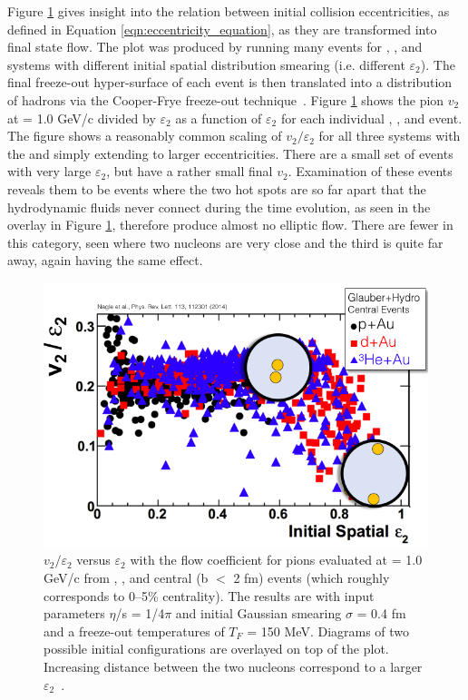 Figure \ref{fig:v2_epsi2_ampt} gives insight into the relation between initial collision eccentricities, as defined in Equation \ref{eqn:eccentricity_equation}, as they are transformed into final state flow. The plot was produced by running many events for \pau, \dau, and \hau systems with different initial spatial distribution smearing (i.e. different $\varepsilon_2$). The final freeze-out hyper-surface of each event is then translated into a distribution of hadrons via the Cooper-Frye freeze-out technique~\cite{PhysRevD.10.186}. Figure \ref{fig:v2_epsi2_ampt} shows the pion $v_2$ at \pt = 1.0 GeV/c divided by $\varepsilon_2$ as a function of $\varepsilon_2$ for each individual \pau, \dau, and \hau event. The figure shows a reasonably common scaling of $v_2/\varepsilon_2$ for all three systems with the \dau and \hau simply extending to larger eccentricities. There are a small set of events with very large $\varepsilon_2$, but have a rather small final $v_2$. Examination of these events reveals them to be \dau events where the two hot spots are so far apart that the hydrodynamic fluids never connect during the time evolution, as seen in the overlay in Figure \ref{fig:v2_epsi2_ampt}, therefore produce almost no elliptic flow. There are fewer \hau in this category, seen where two nucleons are very close and the third is quite far away, again having the same effect.

\begin{figure}[!ht]
\begin{center}
\includegraphics[width=0.6\linewidth]{figs/v2_e2_ampt.png}
\caption{$v_2/\varepsilon_2$ versus $\varepsilon_2$ with the flow coefficient
for pions evaluated at \pt = 1.0 GeV/c from \pau,
\dau, and \hau central (b $<$ 2 fm) events (which roughly corresponds to 0--5\% centrality). The results
are with input parameters $\eta$/s = 1/4$\pi$ and initial Gaussian
smearing $\sigma$ = 0.4 fm and a freeze-out temperatures of $T_F$ = 150
MeV. Diagrams of two possible \dau initial configurations are overlayed on top of the plot. Increasing distance between the two \dau nucleons correspond to a larger $\varepsilon_2$~\cite{PhysRevLett.113.112301}.}
\label{fig:v2_epsi2_ampt}
\end{center}
\end{figure}

